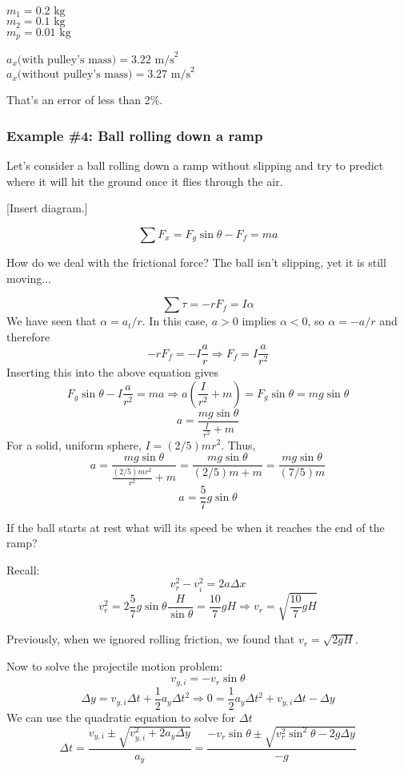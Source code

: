$m_1=0.2\mbox{ kg}$\\
$m_2=0.1\mbox{ kg}$\\
$m_p=0.01\mbox{ kg}$

$a_x\mbox{(with pulley's mass)}=3.22\mbox{ m/s}^2$\\
$a_x\mbox{(without pulley's mass)}=3.27\mbox{ m/s}^2$

That's an error of less than 2$\%$.

\subsubsection{Example \#4: Ball rolling down a ramp}
Let's consider a ball rolling down a ramp without slipping and try to predict where it will hit the ground once it flies through the air.

[Insert diagram.]
\vspace{5cm}

$$\sum F_x=F_g\sin\theta-F_f=ma $$

How do we deal with the frictional force? The ball isn't slipping, yet it is still moving...

$$\sum\tau=-rF_f=I\alpha $$
We have seen that $\alpha=a_t/r$. In this case, $a>0$ implies $\alpha<0$, so $\alpha=-a/r$ and therefore
$$-rF_f=-I\frac{a}{r}\Rightarrow F_f=I\frac{a}{r^2}$$
Inserting this into the above equation gives
$$F_g\sin\theta-I\frac{a}{r^2}=ma\Rightarrow a\left(\frac{I}{r^2}+m\right)=F_g\sin\theta=mg\sin\theta$$
$$a=\frac{mg\sin\theta}{\frac{I}{r^2}+m}$$
For a solid, uniform sphere, $I=(2/5)mr^2$. Thus,
$$a=\frac{mg\sin\theta}{\frac{(2/5)mr^2}{r^2}+m}=\frac{mg\sin\theta}{(2/5)m+m}=\frac{mg\sin\theta}{(7/5)m}$$
$$\boxed{a=\frac{5}{7}g\sin\theta}$$

If the ball starts at rest what will its speed be when it reaches the end of the ramp?

Recall:\\
$$v_r^2-v_i^2=2a\Delta{x}$$
$$v_r^2=2\frac{5}{7}g\sin\theta\frac{H}{\sin\theta}=\frac{10}{7}gH\Rightarrow \boxed{v_r=\sqrt{\frac{10}{7}gH}}$$

Previously, when we ignored rolling friction, we found that $v_r=\sqrt{2gH}$.

Now to solve the projectile motion problem:
$$v_{y,i}=-v_r\sin\theta$$
$$\Delta{y}=v_{y,i}\Delta{t}+\frac{1}{2}a_y\Delta{t}^2\Rightarrow 0 = \frac{1}{2}a_y\Delta{t}^2+v_{y,i}\Delta{t}-\Delta{y}$$
We can use the quadratic equation to solve for $\Delta{t}$
$$\Delta{t}=\frac{v_{y,i}\pm\sqrt{v_{y,i}^2+2a_y\Delta{y}}}{a_y}=\frac{-v_r\sin\theta\pm\sqrt{v_r^2\sin^2\theta-2g\Delta{y}}}{-g}$$

